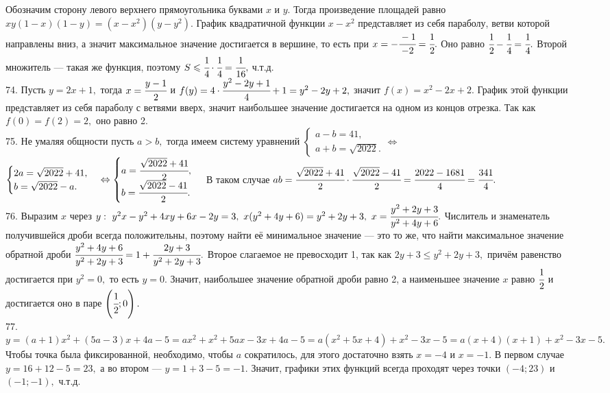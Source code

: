 \documentclass[12pt]{article}
\begin{document}
Обозначим сторону левого верхнего прямоугольника буквами $x$ и $y.$ Тогда произведение площадей равно $xy(1-x)(1-y)=(x-x^2)(y-y^2).$ График квадратичной функции $x-x^2$ представляет из себя параболу, ветви которой направлены вниз, а значит максимальное значение достигается в вершине, то есть при $x=-\cfrac{-1}{-2}=\cfrac{1}{2}.$ Оно равно $\cfrac{1}{2}-\cfrac{1}{4}=\cfrac{1}{4}.$ Второй множитель --- такая же функция, поэтому $S\leqslant \cfrac{1}{4}\cdot \cfrac{1}{4}=\cfrac{1}{16},$ ч.т.д.\\
74. Пусть $y=2x+1,$ тогда $x=\cfrac{y-1}{2}$ и $f(y)=4\cdot\cfrac{y^2-2y+1}{4}+1=y^2-2y+2,$ значит $f(x)=x^2-2x+2.$ График этой функции представляет из себя параболу с ветвями вверх, значит наибольшее значение достигается на одном из концов отрезка. Так как $f(0)=f(2)=2,$ оно равно 2.\\
75. Не умаляя общности пусть $a>b,$ тогда имеем систему уравнений $\begin{cases} a-b=41,\\ a+b=\sqrt{2022}.\end{cases}\Leftrightarrow$\\$ \begin{cases} 2a=\sqrt{2022}+41,\\ b=\sqrt{2022}-a.\end{cases}\Leftrightarrow\begin{cases} a=\cfrac{\sqrt{2022}+41}{2},\\ b=\cfrac{\sqrt{2022}-41}{2}.\end{cases}$ В таком случае $ab=\cfrac{\sqrt{2022}+41}{2}\cdot\cfrac{\sqrt{2022}-41}{2}=\cfrac{2022-1681}{4}=\cfrac{341}{4}.$\\
76. Выразим $x$ через $y:\ y^2x-y^2+4xy+6x-2y=3,\ x(y^2+4y+6)=y^2+2y+3,\ x=\cfrac{y^2+2y+3}{y^2+4y+6}.$ Числитель и знаменатель получившейся дроби всегда положительны, поэтому найти её минимальное значение --- это то же, что найти максимальное значение обратной дроби $\cfrac{y^2+4y+6}{y^2+2y+3}=1+\cfrac{2y+3}{y^2+2y+3}.$ Второе слагаемое не превосходит 1, так как $2y+3\leqslant y^2+2y+3,$ причём равенство достигается при $y^2=0,$ то есть $y=0.$ Значит, наибольшее значение обратной дроби равно 2, а наименьшее значение $x$ равно $\cfrac{1}{2}$ и достигается оно в паре $\left(\cfrac{1}{2};0\right).$\\
77. $y=(a+1)x^2+(5a-3)x+4a-5=ax^2+x^2+5ax-3x+4a-5=a(x^2+5x+4)+x^2-3x-5=a(x+4)(x+1)+x^2-3x-5.$ Чтобы точка была фиксированной, необходимо, чтобы $a$ сократилось, для этого достаточно взять $x=-4$ и $x=-1.$ В первом случае $y=16+12-5=23,$ а во втором --- $y=1+3-5=-1.$ Значит, графики этих функций всегда проходят через точки $(-4;23)$ и $(-1;-1),$ ч.т.д.\\
\end{document}
